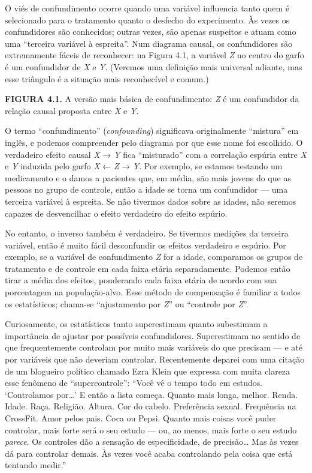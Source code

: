 \documentclass[11pt,a5paper,twoside]{book}
\begin{document}
O viés de confundimento ocorre quando uma variável influencia tanto quem é selecionado para o tratamento quanto o desfecho do experimento. Às vezes os confundidores são conhecidos; outras vezes, são apenas suspeitos e atuam como uma “terceira variável à espreita”. Num diagrama causal, os confundidores são extremamente fáceis de reconhecer: na Figura 4.1, a variável \textit{Z} no centro do garfo é um confundidor de \textit{X} e \textit{Y}. (Veremos uma definição mais universal adiante, mas esse triângulo é a situação mais reconhecível e comum.)

\textbf{FIGURA 4.1.} A versão mais básica de confundimento: \textit{Z} é um confundidor da relação causal proposta entre \textit{X} e \textit{Y}.

O termo “confundimento” (\textit{confounding}) significava originalmente “mistura” em inglês, e podemos compreender pelo diagrama por que esse nome foi escolhido. O verdadeiro efeito causal \textit{X} → \textit{Y} fica “misturado” com a correlação espúria entre \textit{X} e \textit{Y} induzida pelo garfo \textit{X} ← \textit{Z} → \textit{Y}. Por exemplo, se estamos testando um medicamento e o damos a pacientes que, em média, são mais jovens do que as pessoas no grupo de controle, então a idade se torna um confundidor — uma terceira variável à espreita. Se não tivermos dados sobre as idades, não seremos capazes de desvencilhar o efeito verdadeiro do efeito espúrio.

No entanto, o inverso também é verdadeiro. Se tivermos medições da terceira variável, então é muito fácil desconfundir os efeitos verdadeiro e espúrio. Por exemplo, se a variável de confundimento \textit{Z} for a idade, comparamos os grupos de tratamento e de controle em cada faixa etária separadamente. Podemos então tirar a média dos efeitos, ponderando cada faixa etária de acordo com sua porcentagem na população-alvo. Esse método de compensação é familiar a todos os estatísticos; chama-se “ajustamento por \textit{Z}” ou “controle por \textit{Z}”.

Curiosamente, os estatísticos tanto superestimam quanto subestimam a importância de ajustar por possíveis confundidores. Superestimam no sentido de que frequentemente controlam por muito mais variáveis do que precisam — e até por variáveis que não deveriam controlar. Recentemente deparei com uma citação de um blogueiro político chamado Ezra Klein que expressa com muita clareza esse fenômeno de “supercontrole”: “Você vê o tempo todo em estudos. ‘Controlamos por…’ E então a lista começa. Quanto mais longa, melhor. Renda. Idade. Raça. Religião. Altura. Cor do cabelo. Preferência sexual. Frequência na CrossFit. Amor pelos pais. Coca ou Pepsi. Quanto mais coisas você puder controlar, mais forte será o seu estudo — ou, ao menos, mais forte o seu estudo \textit{parece}. Os controles dão a sensação de especificidade, de precisão… Mas às vezes dá para controlar demais. Às vezes você acaba controlando pela coisa que está tentando medir.”
\end{document}
